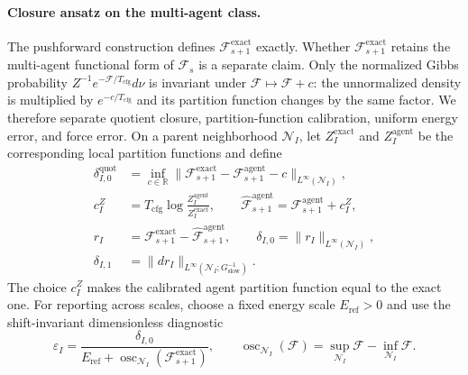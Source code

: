 \documentclass[11pt]{article}
\begin{document}
\paragraph{Closure ansatz on the multi-agent class.}
The pushforward construction defines $\mathcal{F}^{\mathrm{exact}}_{s+1}$ exactly. Whether $\mathcal{F}^{\mathrm{exact}}_{s+1}$ retains the multi-agent functional form of $\mathcal{F}_s$ is a separate claim. Only the normalized Gibbs probability $Z^{-1}e^{-\mathcal{F}/T_{\mathrm{cfg}}}d\nu$ is invariant under $\mathcal{F}\mapsto\mathcal{F}+c$: the unnormalized density is multiplied by $e^{-c/T_{\mathrm{cfg}}}$ and its partition function changes by the same factor. We therefore separate quotient closure, partition-function calibration, uniform energy error, and force error. On a parent neighborhood $\mathcal{N}_I$, let $Z_I^{\mathrm{exact}}$ and $Z_I^{\mathrm{agent}}$ be the corresponding local partition functions and define
\begin{align}
\delta_{I,0}^{\mathrm{quot}}
 &= \inf_{c\in\mathbb{R}}\big\|\mathcal{F}^{\mathrm{exact}}_{s+1}-\mathcal{F}^{\mathrm{agent}}_{s+1}-c\big\|_{L^\infty(\mathcal{N}_I)}, \nonumber\\
c_I^Z
 &= T_{\mathrm{cfg}}\log\frac{Z_I^{\mathrm{agent}}}{Z_I^{\mathrm{exact}}}, \qquad
\widehat{\mathcal{F}}^{\mathrm{agent}}_{s+1}=\mathcal{F}^{\mathrm{agent}}_{s+1}+c_I^Z, \nonumber\\
r_I
 &= \mathcal{F}^{\mathrm{exact}}_{s+1}-\widehat{\mathcal{F}}^{\mathrm{agent}}_{s+1}, \qquad
\delta_{I,0}=\|r_I\|_{L^\infty(\mathcal{N}_I)}, \nonumber\\
\delta_{I,1}
 &= \|dr_I\|_{L^\infty(\mathcal{N}_I;G_{\mathrm{slow}}^{-1})}.
\label{eq:rg_closure}
\end{align}
The choice $c_I^Z$ makes the calibrated agent partition function equal to the exact one. For reporting across scales, choose a fixed energy scale $E_{\mathrm{ref}}>0$ and use the shift-invariant dimensionless diagnostic
\begin{equation}
\varepsilon_I=\frac{\delta_{I,0}}{E_{\mathrm{ref}}+\operatorname{osc}_{\mathcal{N}_I}(\mathcal{F}^{\mathrm{exact}}_{s+1})}, \qquad
\operatorname{osc}_{\mathcal{N}_I}(\mathcal{F})=\sup_{\mathcal{N}_I}\mathcal{F}-\inf_{\mathcal{N}_I}\mathcal{F}.
\label{eq:rg_closure_dimensionless}
\end{equation}
\end{document}
